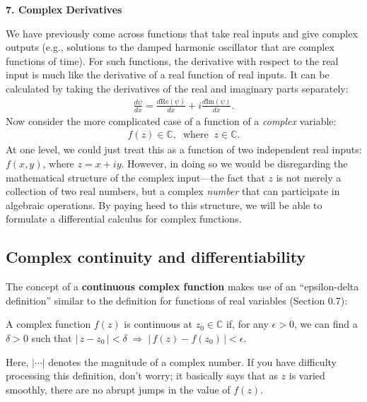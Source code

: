 \documentclass[10pt,a4paper]{article}
\begin{document}
\setcounter{page}{47}

\noindent
{\Large \textbf{7. Complex Derivatives}}
\vskip 0.2in

\label{complex-derivatives}

We have previously come across functions that take real inputs and
give complex outputs (e.g., solutions to the damped harmonic
oscillator that are complex functions of time).  For such functions,
the derivative with respect to the real input is much like the
derivative of a real function of real inputs.  It can be calculated by
taking the derivatives of the real and imaginary parts separately:
\begin{align}
  \frac{d\psi}{dx} = \frac{d\mathrm{Re}(\psi)}{dx} + i \frac{d\mathrm{Im}(\psi)}{dx}.
\end{align}
Now consider the more complicated case of a function of a
\textit{complex} variable:
\begin{align}
  f(z) \in \mathbb{C}, \;\;\mathrm{where}\;\; z \in \mathbb{C}.
\end{align}
At one level, we could just treat this as a function of two
independent real inputs: $f(x,y)$, where $z = x + i y$. However, in
doing so we would be disregarding the mathematical structure of the
complex input---the fact that $z$ is not merely a collection of two
real numbers, but a complex \textit{number} that can participate in
algebraic operations.  By paying heed to this structure, we will be
able to formulate a differential calculus for complex functions.

\subsection{Complex continuity and differentiability}
\label{complex-continuity-and-differentiability}

The concept of a \textbf{continuous complex function} makes use of an
``epsilon-delta definition'' similar to the definition for functions
of real variables (Section 0.7):

\begin{framed}
  \noindent
  A complex function $f(z)$ is continuous at $z_0 \in \mathbb{C}$ if, for any $\epsilon > 0$, we can find a $\delta > 0$ such that $\big|\, z - z_0 \,\big| < \delta \; \Rightarrow \; \big|\, f(z) - f(z_0) \,\big| < \epsilon$.
\end{framed}

\noindent
Here, $|\cdots|$ denotes the magnitude of a complex number.  If you
have difficulty processing this definition, don't worry; it basically
says that as $z$ is varied smoothly, there are no abrupt jumps in the
value of $f(z)$.
\end{document}
